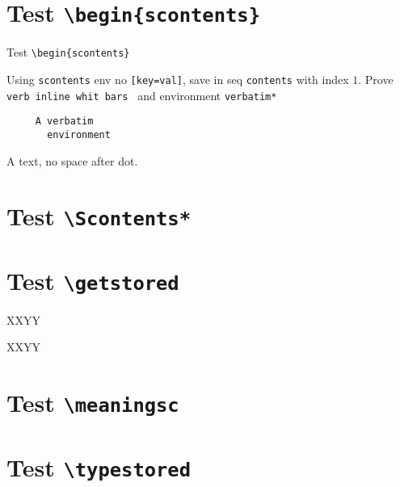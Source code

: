 \documentclass{article}
\begin{document}
\section{Test \texttt{\textbackslash begin\{scontents\}}}
Test \verb+\begin{scontents}+ \par

\begin{scontents}
Using \verb+scontents+ env no \verb+[key=val]+, save in seq \verb+contents+ 
with index $1$.
Prove \verb*| verb inline whit bars | and environment \verb+verbatim*+
\begin{verbatim}
     A verbatim  
       environment
\end{verbatim}
A text, no space after dot.
\end{scontents}

\section{Test \texttt{\textbackslash Scontents*}}


\section{Test \texttt{\textbackslash getstored}}

XXYY\par
XXYY

\section{Test \texttt{\textbackslash meaningsc}}

\par


\section{Test \texttt{\textbackslash typestored}}


\end{document}
